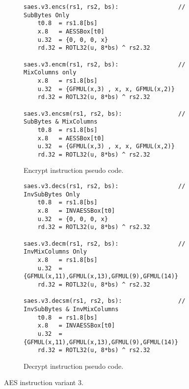 \begin{figure}

\begin{subfigure}[b]{1.0\textwidth}
\begin{lstlisting}
saes.v3.encs(rs1, rs2, bs):                 // SubBytes Only
    t0.8  = rs1.8[bs]
    x.8   = AESSBox[t0]
    u.32  = {0, 0, 0, x}
    rd.32 = ROTL32(u, 8*bs) ^ rs2.32

saes.v3.encm(rs1, rs2, bs):                 // MixColumns only
    x.8   = rs1.8[bs]
    u.32  = {GFMUL(x,3) , x, x, GFMUL(x,2)}
    rd.32 = ROTL32(u, 8*bs) ^ rs2.32

saes.v3.encsm(rs1, rs2, bs):                // SubBytes & MixColumns
    t0.8  = rs1.8[bs]
    x.8   = AESSBox[t0]
    u.32  = {GFMUL(x,3) , x, x, GFMUL(x,2)}
    rd.32 = ROTL32(u, 8*bs) ^ rs2.32
\end{lstlisting}
\caption{Encrypt instruction pseudo code.}
\label{fig:pesudo:aes:v3:enc}
\end{subfigure}

\begin{subfigure}[b]{1.0\textwidth}
\begin{lstlisting}
saes.v3.decs(rs1, rs2, bs):                 // InvSubBytes Only
    t0.8  = rs1.8[bs]
    x.8   = INVAESSBox[t0]
    u.32  = {0, 0, 0, x}
    rd.32 = ROTL32(u, 8*bs) ^ rs2.32

saes.v3.decm(rs1, rs2, bs):                 // InvMixColumns Only
    x.8   = rs1.8[bs]
    u.32  = {GFMUL(x,11),GFMUL(x,13),GFMUL(9),GFMUL(14)}
    rd.32 = ROTL32(u, 8*bs) ^ rs2.32

saes.v3.decsm(rs1, rs2, bs):                // InvSubBytes & InvMixColumns
    t0.8  = rs1.8[bs]
    x.8   = INVAESSBox[t0]
    u.32  = {GFMUL(x,11),GFMUL(x,13),GFMUL(9),GFMUL(14)}
    rd.32 = ROTL32(u, 8*bs) ^ rs2.32
\end{lstlisting}
\caption{Decrypt instruction pseudo code.}
\label{fig:pesudo:aes:v3:dec}
\end{subfigure}
\caption{AES instruction variant 3.}
\end{figure}
